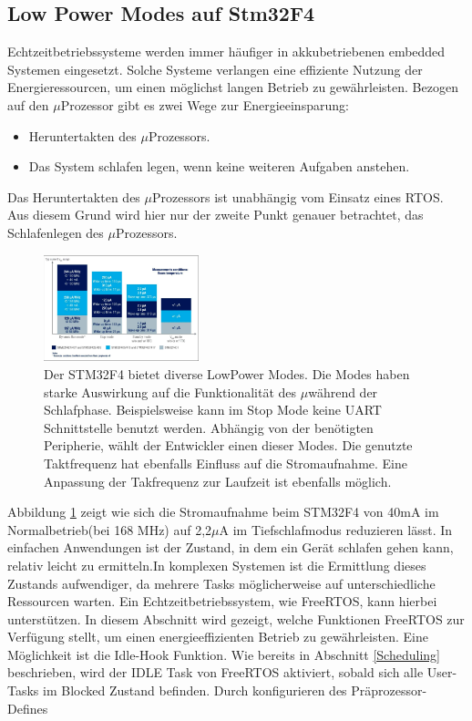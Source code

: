 \subsection{Low Power Modes auf Stm32F4}
\label{sec:Low Power Modes}
Echtzeitbetriebssysteme werden immer häufiger in akkubetriebenen embedded Systemen eingesetzt. Solche Systeme verlangen eine effiziente Nutzung der Energieressourcen, um einen möglichst langen Betrieb zu ge\-währ\-leis\-ten. Bezogen auf den $\mu$\-Pro\-zesso\-r gibt es zwei Wege zur Energieeinsparung:
\begin{itemize}
	\item Heruntertakten des $\mu$\-Pro\-zesso\-rs.
	\item Das System schlafen legen, wenn keine weiteren Aufgaben anstehen.
\end{itemize}
Das Heruntertakten des $\mu$\-Pro\-zesso\-rs ist unabhängig vom Einsatz eines RTOS. Aus diesem Grund wird hier nur der zweite Punkt genauer betrachtet, das Schlafenlegen des $\mu$\-Pro\-zesso\-rs. 
\begin{figure}[htb!]
	\centering
		\includegraphics[width=0.4\textwidth]{Pictures/STM32F4/powerConsumption.png}
	\caption{Der STM32F4 bietet diverse LowPower Modes. Die Modes haben starke Auswirkung auf die Funktionalität des $\mu$\Controllers während der Schlafphase. Beispielsweise kann im Stop Mode keine UART Schnittstelle benutzt werden. Abhängig von der benötigten Peripherie, wählt der Entwickler einen dieser Modes. Die genutzte Taktfrequenz hat ebenfalls Einfluss auf die Stromaufnahme. Eine Anpassung der Takfrequenz zur Laufzeit ist ebenfalls möglich.}
	\label{fig:powerconsum}
\end{figure}
Abbildung \ref{fig:powerconsum} zeigt wie sich die Stromaufnahme beim STM32F4 von 40mA im Normalbetrieb(bei 168 MHz) auf 2,2$\mu$A im Tiefschlafmodus reduzieren lässt. 
In einfachen Anwendungen ist der Zustand, in dem ein Gerät schlafen gehen kann, relativ leicht zu ermitteln.\newline In komplexen Systemen ist die Ermittlung dieses Zustands aufwendiger, da mehrere Tasks mög\-li\-cherweise auf unterschiedliche Ressourcen warten. Ein Echtzeitbetriebssystem, wie FreeRTOS, kann hierbei unterstützen. In diesem Abschnitt wird gezeigt, welche Funktionen FreeRTOS zur Ver\-fü\-gung stellt, um einen energieeffizienten Betrieb zu ge\-währ\-leis\-ten. Eine Mög\-lich\-keit ist die Idle-Hook Funktion. Wie bereits in Abschnitt \ref{Scheduling} beschrieben, wird der IDLE Task von FreeRTOS aktiviert, sobald sich alle User-Tasks im Blocked Zustand befinden. Durch konfigurieren des Präprozessor-Defines        

